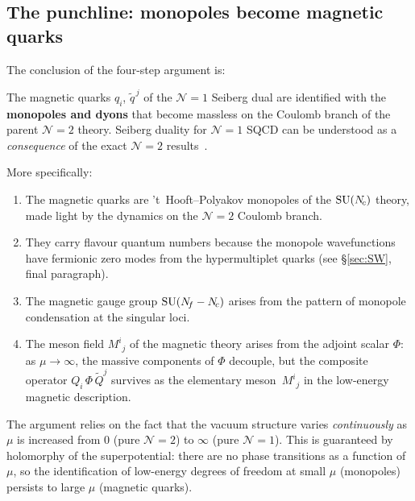 \documentclass[11pt,a4paper]{article}
\begin{document}
\subsection{The punchline: monopoles become magnetic quarks}

The conclusion of the four-step argument is:

\begin{tcolorbox}[
  enhanced,
  colback=yellow!8!white,
  colframe=yellow!60!black,
  fonttitle=\bfseries\large,
  title={Origin of Magnetic Quarks}
]
The magnetic quarks $q_i$, $\widetilde{q}^{\,j}$ of the $\mathcal{N}=1$
Seiberg dual are identified with the \textbf{monopoles and dyons} that
become massless on the Coulomb branch of the parent $\mathcal{N}=2$
theory.  Seiberg duality for $\mathcal{N}=1$ SQCD can be understood as
a \emph{consequence} of the exact $\mathcal{N}=2$
results~\cite{APS1996}.
\end{tcolorbox}

\medskip

More specifically:
\begin{enumerate}[label=(\alph*)]
  \item The magnetic quarks are 't~Hooft--Polyakov monopoles of the
    $\mathrm{SU}(N_{\!c})$ theory, made light by the dynamics on the
    $\mathcal{N}=2$ Coulomb branch.
  \item They carry flavour quantum numbers because the monopole
    wavefunctions have fermionic zero modes from the hypermultiplet
    quarks (see \S\ref{sec:SW}, final paragraph).
  \item The magnetic gauge group $\mathrm{SU}(N_{\!f} - N_{\!c})$ arises from the
    pattern of monopole condensation at the singular loci.
  \item The meson field $M^i{}_j$ of the magnetic theory arises from the
    adjoint scalar $\Phi$: as $\mu \to \infty$, the massive components
    of $\Phi$ decouple, but the composite operator
    $Q_i\,\Phi\,\widetilde{Q}^j$ survives as the elementary
    meson~$M^i{}_j$ in the low-energy magnetic description.
\end{enumerate}

\begin{remark}
  The argument relies on the fact that the vacuum structure varies
  \emph{continuously} as $\mu$ is increased from $0$ (pure
  $\mathcal{N}=2$) to $\infty$ (pure $\mathcal{N}=1$).  This is
  guaranteed by holomorphy of the superpotential: there are no phase
  transitions as a function of $\mu$, so the identification of
  low-energy degrees of freedom at small $\mu$ (monopoles) persists
  to large $\mu$ (magnetic quarks).
\end{remark}
\end{document}
